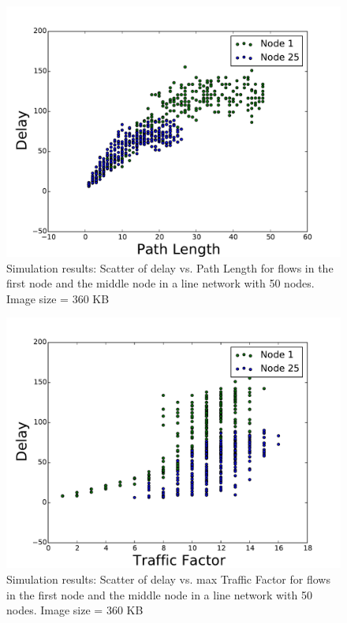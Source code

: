 \documentclass[conference]{IEEEtran}
\begin{document}
\begin{figure}
\begin{centering}
    \includegraphics[scale=0.4, clip=true, trim=0mm 0mm 0mm 0mm]{figs_exp_vs_anal/num_nodes_50/image_size_360/timeliness_165/line_net/delay_vs_PL_scatter.pdf}
    \caption{ Simulation results: Scatter of delay vs. Path Length for flows in the first node and the middle node in a line network with 50 nodes.  Image size = 360 KB}
    \label{fig:delay_vs_PL_scatter_N_50_IS_360}
\end{centering}
\end{figure}

\begin{figure}
\begin{centering}
    \includegraphics[scale=0.4, clip=true, trim=0mm 0mm 0mm 0mm]{figs_exp_vs_anal/num_nodes_50/image_size_360/timeliness_165/line_net/delay_vs_TF_scatter.pdf}
    \caption{ Simulation results: Scatter of delay vs. max Traffic Factor for flows in the first node and the middle node in a line network with 50 nodes.  Image size = 360 KB}
    \label{fig:delay_vs_TF_scatter_N_50_IS_360}
\end{centering}
\end{figure}
\end{document}

